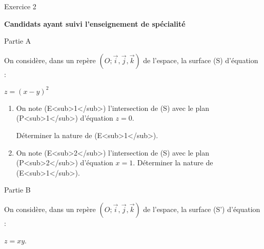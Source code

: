 
%
\begin{h2}Exercice 2\end{h2}
\textbf{Candidats ayant suivi l'enseignement de spécialité}
\begin{h3}Partie A\end{h3}
On considère, dans un repère $\left(O ; \vec{i},\vec{j},\vec{k}\right)$ de l'espace, la surface (S) d'équation :

\begin{center}
$z=\left(x-y\right)^{2}$
\end{center}

\begin{enumerate}
     \item
     On note (E<sub>1</sub>) l'intersection de (S) avec le plan (P<sub>1</sub>) d'équation $z=0$.
     \par
     Déterminer la nature de (E<sub>1</sub>).
     \item
     On note (E<sub>2</sub>) l'intersection de (S) avec le plan (P<sub>2</sub>) d'équation $x=1$. Déterminer la nature de (E<sub>1</sub>).
\end{enumerate}
\begin{h3}Partie B\end{h3}
On considère, dans un repère $\left(O ; \vec{i},\vec{j},\vec{k}\right)$ de l'espace, la surface (S') d'équation :

\begin{center}
$z=xy$.
\end{center}

